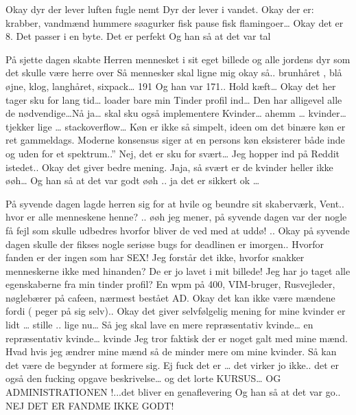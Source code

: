 \documentclass[a4paper,11pt]{article}
\begin{document}
\begin{sketch}
Okay dyr der lever luften
fugle
nemt
Dyr der lever i vandet. 
Okay der er:
krabber,
vandmænd
hummere
søagurker
fisk  
pause fisk
flamingoer…
Okay det er 8. Det passer i en byte. Det er perfekt 
 Og han så  at det var tal 

 På sjette dagen skabte Herren mennesket i sit eget billede og alle jordens dyr som det skulle være herre over
 Så mennesker skal ligne mig 
 okay så.. brunhåret , blå øjne, klog, langhåret, sixpack… 191
 Og han var 171..
Hold kæft… Okay det her tager sku for lang tid… loader bare min Tinder profil ind… Den har alligevel alle de nødvendige…Nå ja… skal sku også implementere Kvinder… ahemm … kvinder… tjekker lige … stackoverflow… 
 Køn er ikke så simpelt, ideen om det binære køn er ret gammeldags. Moderne konsensus siger at en persons køn eksisterer både inde og uden for et spektrum..” Nej, det er sku for svært… Jeg hopper ind på Reddit istedet.. Okay det giver bedre mening. 
 Jaja, så svært er de kvinder heller ikke 
 øøh… 
 Og han så at  det var godt 
 øøh .. ja det er sikkert ok …

 På syvende dagen lagde herren sig for at hvile og beundre sit skaberværk, 
 Vent.. hvor er alle menneskene henne?
.. øøh jeg mener, på syvende dagen var der nogle få fejl som skulle udbedres
 hvorfor bliver de ved med at uddø!
.. Okay på syvende dagen skulle der fikses nogle seriøse bugs for deadlinen er imorgen..
Hvorfor fanden er der ingen som har SEX!
Jeg forstår det ikke, hvorfor snakker menneskerne ikke med hinanden?
De er jo lavet i mit billede!
Jeg har jo taget alle egenskaberne fra min tinder profil? En wpm på 400, VIM-bruger, Rusvejleder, nøglebærer på cafeen, nærmest bestået AD.
Okay det kan ikke være mændene  fordi ( peger på sig selv)..
Okay det giver selvfølgelig mening for mine kvinder er lidt … stille .. lige nu…
 Så jeg skal lave en mere repræsentativ kvinde… en repræsentativ kvinde… kvinde
Jeg tror faktisk der er noget galt med mine mænd. Hvad hvis jeg ændrer mine mænd så de minder mere om mine kvinder. Så kan det være de begynder at formere sig.
 Ej fuck det er … det virker jo ikke.. det er også den fucking opgave beskrivelse… og det lorte KURSUS…  OG ADMINISTRATIONEN !...det bliver en genaflevering 
 Og han så at det var go..
 NEJ DET ER FANDME IKKE GODT!

\end{sketch}
\end{document}

